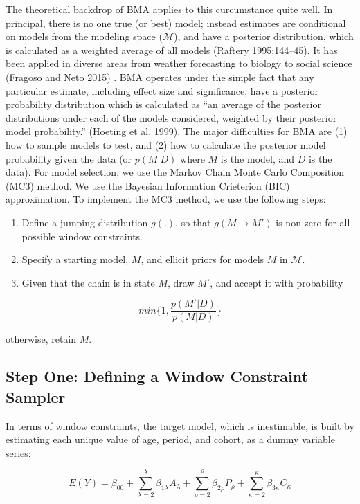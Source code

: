 \documentclass[]{article}
\providecommand{\tightlist}{%
  \setlength{\itemsep}{0pt}\setlength{\parskip}{0pt}}
\begin{document}
The theoretical backdrop of BMA applies to this curcumstance quite well.
In principal, there is no one true (or best) model; instead estimates
are conditional on models from the modeling space (\(\mathscr{M}\)), and
have a posterior distribution, which is calculated as a weighted average
of all models (Raftery 1995:144--45). It has been applied in diverse
areas from weather forecasting to biology to social science (Fragoso and
Neto 2015) . BMA operates under the simple fact that any particular
estimate, including effect size and significance, have a posterior
probability distribution which is calculated as ``an average of the
posterior distributions under each of the models considered, weighted by
their posterior model probability.'' (Hoeting et al. 1999). The major
difficulties for BMA are (1) how to sample models to test, and (2) how
to calculate the posterior model probability given the data (or
\(p(M|D)\) where \(M\) is the model, and \(D\) is the data). For model
selection, we use the Markov Chain Monte Carlo Composition (MC3) method.
We use the Bayesian Information Crieterion (BIC) approximation. To
implement the MC3 method, we use the following steps:

\begin{enumerate}
\def\labelenumi{\arabic{enumi}.}
\tightlist
\item
  Define a jumping distribution \(g(.)\), so that
  \(g(M \rightarrow M')\) is non-zero for all possible window
  constraints.
\item
  Specify a starting model, \(M\), and ellicit priors for models \(M\)
  in \(\mathscr{M}\).
\item
  Given that the chain is in state \(M\), draw \(M'\), and accept it
  with probability
\end{enumerate}

\[
min  \Bigg \{ 1, \frac{p(M'|D)}{p(M|D)} \Bigg \} 
\]

otherwise, retain \(M\).

\subsection{Step One: Defining a Window Constraint
Sampler}\label{step-one-defining-a-window-constraint-sampler}

In terms of window constraints, the target model, which is inestimable,
is built by estimating each unique value of age, period, and cohort, as
a dummy variable series:

\[
E(Y) = \beta_{00} + \sum_{\lambda=2}^{\lambda} \beta_{1\lambda}A_{\lambda} +  \sum_{\rho=2}^{\rho} \beta_{2\rho}P_{\rho} +  \sum_{\kappa=2}^{\kappa} \beta_{3\kappa}C_{\kappa}
\]
\end{document}
